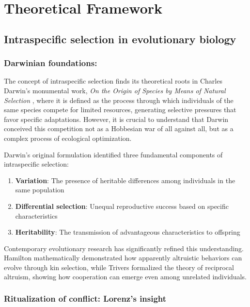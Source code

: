 \chapter{Theoretical Framework}
\label{theoretical-framework}

\section{Intraspecific selection in evolutionary biology}
\subsection*{Darwinian foundations:}

The concept of intraspecific selection finds its theoretical roots in Charles Darwin's monumental work, \textit{On the Origin of Species by Means of Natural Selection} \cite{Darwin1859}, where it is defined as the process through which individuals of the same species compete for limited resources, generating selective pressures that favor specific adaptations. However, it is crucial to understand that Darwin conceived this competition not as a Hobbesian war of all against all, but as a complex process of ecological optimization.

Darwin's original formulation identified three fundamental components of intraspecific selection:

\begin{enumerate}
	\item \textbf{Variation}: The presence of heritable differences among individuals in the same population
	\item \textbf{Differential selection}: Unequal reproductive success based on specific characteristics
	\item \textbf{Heritability}: The transmission of advantageous characteristics to offspring
\end{enumerate}

Contemporary evolutionary research has significantly refined this understanding. Hamilton \cite{Hamilton1964} mathematically demonstrated how apparently altruistic behaviors can evolve through kin selection, while Trivers \cite{Trivers1971} formalized the theory of reciprocal altruism, showing how cooperation can emerge even among unrelated individuals.

\newpage

\subsection{Ritualization of conflict: Lorenz's insight}

